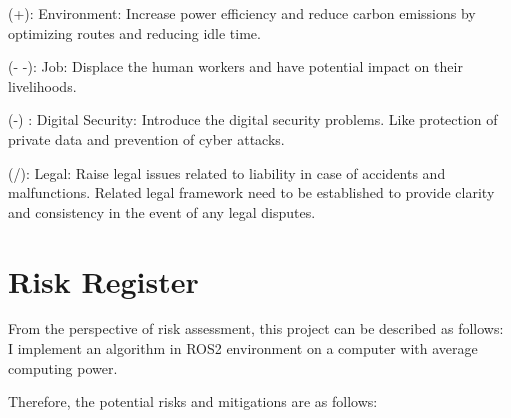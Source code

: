 \documentclass[12pt, oneside]{article}
\begin{document}
(+):  Environment: Increase power efficiency and reduce carbon emissions by optimizing routes and reducing idle time.


(- -): Job: Displace the human workers and have potential impact on their livelihoods.

(-) : Digital Security: Introduce the digital security problems. Like protection of private data and prevention of cyber attacks.

(/): Legal: Raise legal issues related to liability in case of accidents and malfunctions. Related legal framework need to be established  to provide clarity and consistency in the event of any legal disputes.
\section{Risk Register}

From the perspective of risk assessment, this project can be described as follows: I implement an algorithm in ROS2 environment on a computer with average computing power.

Therefore, the potential risks and mitigations are as follows:
\end{document}
